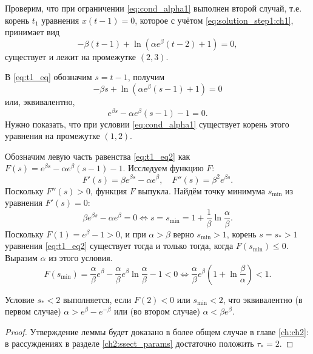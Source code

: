Проверим, что при ограничении \eqref{eq:cond_alpha1} выполнен второй случай, т.е. корень $t_1$ уравнения $x(t - 1) = 0$, которое с учётом \eqref{eq:solution_step1:ch1}, принимает вид
\begin{equation}
\label{eq:t1_eq}
    -\beta (t - 1) + \ln(\alpha e^{\beta}(t - 2) + 1) = 0,
\end{equation}
существует и лежит на промежутке $(2, 3)$.

В \eqref{eq:t1_eq} обозначим $s = t - 1$, получим
%
$$-\beta s + \ln(\alpha e^{\beta} (s - 1) + 1) = 0$$
%
или, эквивалентно,
%
\begin{equation}
\label{eq:t1_eq2}
e^{\beta s} - \alpha e^{\beta} (s - 1) - 1 = 0.
\end{equation}
Нужно показать, что при условии \eqref{eq:cond_alpha1} существует корень этого уравнения на промежутке $(1, 2)$.

Обозначим левую часть равенства \eqref{eq:t1_eq2} как $F(s) = e^{\beta s} - \alpha e^{\beta} (s - 1) - 1$. Исследуем функцию $F$:
%
\[
F'(s) = \beta e^{\beta s} - \alpha e^{\beta}, \quad F''(s) = \beta^2 e^{\beta s}.
\]
%
Поскольку $F''(s) > 0$, функция $F$ выпукла. Найдём точку минимума $s_{\min}$ из уравнения $F'(s) = 0$:
\[
\beta e^{\beta s} - \alpha e^{\beta} = 0 \Leftrightarrow s = s_{\min} = 1 + \frac{1}{\beta}\ln\frac{\alpha}{\beta}.
\]
%
Поскольку $F(1) = e^{\beta} - 1 > 0$, и при $\alpha > \beta$ верно $s_{\min} > 1$, корень $s = s_* > 1$ уравнения \eqref{eq:t1_eq2} существует тогда и только тогда, когда $F(s_{\min}) \leqslant 0$. Выразим $\alpha$ из этого условия.
%
\[
F(s_{\min}) = \frac{\alpha}{\beta}e^{\beta} - \frac{\alpha}{\beta}e^\beta\ln\frac{\alpha}{\beta} - 1 < 0 \Leftrightarrow \frac{\alpha}{\beta}e^{\beta}\left(1 + \ln\frac{\beta}{\alpha}\right) < 1.
\]


Условие $s_* < 2$ выполняется, если $F(2) < 0$ или $s_{\min} < 2$, что эквивалентно (в первом случае) $\alpha > e^{\beta} - e^{-\beta}$ или (во втором случае) $\alpha < \beta e^{\beta}$.

\begin{proof}
	Утверждение леммы будет доказано в более общем случае в главе \ref{ch:ch2}: в рассуждениях в разделе \ref{ch2:ssect_params} достаточно положить $\tau_* = 2$.
\end{proof}

